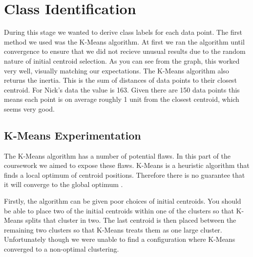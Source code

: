 \documentclass[11pt, a4paper]{article}
\begin{document}
\section{Class Identification}
During this stage we wanted to derive class labels for each data point. The first method  we used was the K-Means algorithm. At first we ran the algorithm until convergence to ensure that we did not recieve unusual results due to the random nature of initial centroid selection. As you can see from the graph, this worked very well, visually matching our expectations. The K-Means algorithm also returns the inertia. This is the sum of distances of data points to their closest centroid. For Nick's data the value is 163. Given there are 150 data points this means each point is on average roughly 1 unit from the closest centroid, which seems very good. 




\subsection{K-Means Experimentation}
The K-Means algorithm has a number of potential flaws. In this part of the coursework we aimed to expose these flaws. K-Means is a heuristic algorithm that finds a local optimum of centroid positions. Therefore there is no guarantee that it will converge to the global optimum \cite{km_wiki}.

%
%  
%  	
Firstly, the algorithm can be given poor choices of initial centroids. You should be able to place two of the initial centroids within one of the clusters so that K-Means splits that cluster in two. The last centroid is then placed between the remaining two clusters so that K-Means treats them as one large cluster. Unfortunately though we were unable to find a configuration where K-Means converged to a non-optimal clustering. 
\end{document}

